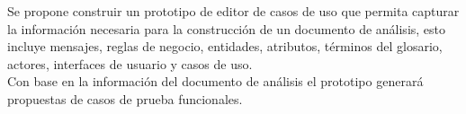 Se propone construir un prototipo de editor de casos de uso que permita capturar la información necesaria para la construcción de un documento de análisis, esto incluye mensajes, reglas de negocio, entidades, atributos, términos del glosario, actores, interfaces de usuario y casos de uso.\\

Con base en la información del documento de análisis el prototipo generará propuestas de casos de prueba funcionales.
\vspace{1cm}




